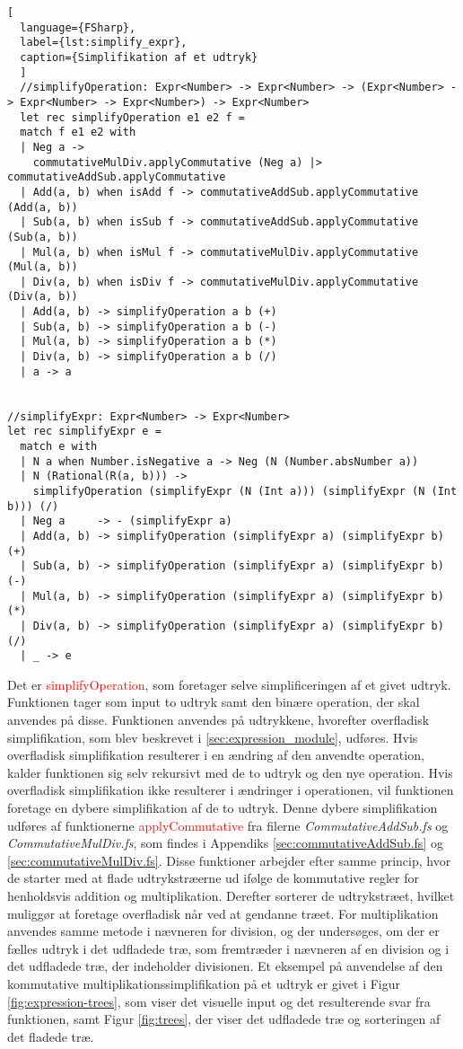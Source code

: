 \begin{lstlisting}[
  language={FSharp}, 
  label={lst:simplify_expr}, 
  caption={Simplifikation af et udtryk}
  ]
  //simplifyOperation: Expr<Number> -> Expr<Number> -> (Expr<Number> -> Expr<Number> -> Expr<Number>) -> Expr<Number>
  let rec simplifyOperation e1 e2 f = 
  match f e1 e2 with
  | Neg a -> 
    commutativeMulDiv.applyCommutative (Neg a) |> commutativeAddSub.applyCommutative
  | Add(a, b) when isAdd f -> commutativeAddSub.applyCommutative (Add(a, b))
  | Sub(a, b) when isSub f -> commutativeAddSub.applyCommutative (Sub(a, b))
  | Mul(a, b) when isMul f -> commutativeMulDiv.applyCommutative (Mul(a, b))
  | Div(a, b) when isDiv f -> commutativeMulDiv.applyCommutative (Div(a, b))
  | Add(a, b) -> simplifyOperation a b (+)
  | Sub(a, b) -> simplifyOperation a b (-)
  | Mul(a, b) -> simplifyOperation a b (*)
  | Div(a, b) -> simplifyOperation a b (/)
  | a -> a


//simplifyExpr: Expr<Number> -> Expr<Number>
let rec simplifyExpr e =
  match e with
  | N a when Number.isNegative a -> Neg (N (Number.absNumber a))
  | N (Rational(R(a, b))) -> 
    simplifyOperation (simplifyExpr (N (Int a))) (simplifyExpr (N (Int b))) (/)
  | Neg a     -> - (simplifyExpr a)
  | Add(a, b) -> simplifyOperation (simplifyExpr a) (simplifyExpr b) (+)
  | Sub(a, b) -> simplifyOperation (simplifyExpr a) (simplifyExpr b) (-)
  | Mul(a, b) -> simplifyOperation (simplifyExpr a) (simplifyExpr b) (*)
  | Div(a, b) -> simplifyOperation (simplifyExpr a) (simplifyExpr b) (/)
  | _ -> e 
\end{lstlisting}

Det er \textcolor{red}{simplifyOperation}, som foretager selve simplificeringen af et givet udtryk. Funktionen tager som input to udtryk samt den binære operation, der skal anvendes på disse. Funktionen anvendes på udtrykkene, hvorefter overfladisk simplifikation, som blev beskrevet i \ref{sec:expression_module}, udføres. Hvis overfladisk simplifikation resulterer i en ændring af den anvendte operation, kalder funktionen sig selv rekursivt med de to udtryk og den nye operation. Hvis overfladisk simplifikation ikke resulterer i ændringer i operationen, vil funktionen foretage en dybere simplifikation af de to udtryk. Denne dybere simplifikation udføres af funktionerne \textcolor{red}{applyCommutative} fra filerne \textit{CommutativeAddSub.fs} og \textit{CommutativeMulDiv.fs}, som findes i Appendiks \ref{sec:commutativeAddSub.fs} og \ref{sec:commutativeMulDiv.fs}. Disse funktioner arbejder efter samme princip, hvor de starter med at flade udtrykstræerne ud ifølge de kommutative regler for henholdsvis addition og multiplikation. Derefter sorterer de udtrykstræet, hvilket muliggør at foretage overfladisk når ved at gendanne træet. For multiplikation anvendes samme metode i nævneren for division, og der undersøges, om der er fælles udtryk i det udfladede træ, som fremtræder i nævneren af en division og i det udfladede træ, der indeholder divisionen. Et eksempel på anvendelse af den kommutative multiplikationssimplifikation på et udtryk er givet i Figur \ref{fig:expression-trees}, som viser det visuelle input og det resulterende svar fra funktionen, samt Figur \ref{fig:trees}, der viser det udfladede træ og sorteringen af det fladede træ.


